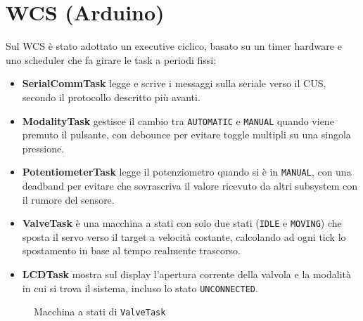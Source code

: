 \documentclass[a4paper,12pt]{report}
\begin{document}
\section{WCS (Arduino)}
Sul WCS è stato adottato un executive ciclico, basato su un timer hardware e uno scheduler che fa girare le task a periodi fissi:
\begin{itemize}
	\item \textbf{SerialCommTask} legge e scrive i messaggi sulla seriale verso il CUS, secondo il protocollo descritto più avanti.
	\item \textbf{ModalityTask} gestisce il cambio tra \texttt{AUTOMATIC} e \texttt{MANUAL} quando viene premuto il pulsante, con debounce per evitare toggle multipli su una singola pressione.
	\item \textbf{PotentiometerTask} legge il potenziometro quando si è in \texttt{MANUAL}, con una deadband per evitare che sovrascriva il valore ricevuto da altri subsystem con il rumore del sensore.
	\item \textbf{ValveTask} è una macchina a stati con solo due stati (\texttt{IDLE} e \texttt{MOVING}) che sposta il servo verso il target a velocità costante, calcolando ad ogni tick lo spostamento in base al tempo realmente trascorso.
	\item \textbf{LCDTask} mostra sul display l'apertura corrente della valvola e la modalità in cui si trova il sistema, incluso lo stato \texttt{UNCONNECTED}.
\end{itemize}
\begin{figure}[H]
	\centering
	
	\caption{Macchina a stati di \texttt{ValveTask}}
	\label{fig:wcs-valvetask}
\end{figure}

\newpage
\end{document}
